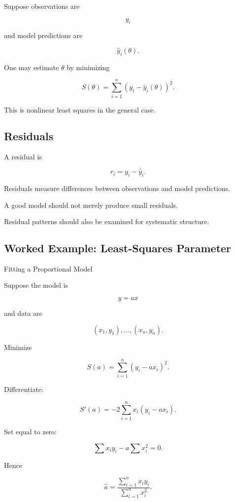 Suppose observations are

\[
\boxed{
y_i
}
\]

and model predictions are

\[
\boxed{
\hat{y}_i(\theta).
}
\]

One may estimate \(\theta\) by minimizing

\[
\boxed{
S(\theta)
=
\sum_{i=1}^{n}
\left(
y_i-\hat{y}_i(\theta)
\right)^2.
}
\]

This is nonlinear least squares in the general case.

\subsection{Residuals}
\label{subsec:model-residuals}

A residual is

\[
\boxed{
r_i
=
y_i-\hat{y}_i.
}
\]

Residuals measure differences between observations and model predictions.

A good model should not merely produce small residuals.

Residual patterns should also be examined for systematic structure.

\subsection{Worked Example: Least-Squares Parameter}
\label{subsec:worked-model-least-squares}

\begin{workedexamplebox}{Fitting a Proportional Model}

Suppose the model is

\[
y=ax
\]

and data are

\[
(x_1,y_1),\ldots,(x_n,y_n).
\]

Minimize

\[
S(a)
=
\sum_{i=1}^{n}
(y_i-ax_i)^2.
\]

Differentiate:

\[
S'(a)
=
-2
\sum_{i=1}^{n}
x_i(y_i-ax_i).
\]

Set equal to zero:

\[
\sum x_i y_i
-
a\sum x_i^2
=
0.
\]

Hence

\begin{answerbox}
\[
\boxed{
\hat{a}
=
\frac{
\sum_{i=1}^{n}x_i y_i
}{
\sum_{i=1}^{n}x_i^2
}.
}
\]
\end{answerbox}

\end{workedexamplebox}

